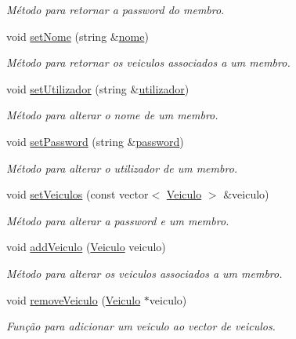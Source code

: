 \begin{DoxyCompactItemize}
\begin{DoxyCompactList}\small\item\em Método para retornar a password do membro. \end{DoxyCompactList}\item 
void \hyperlink{class_membro_a87f95f3869ef8ce4cfaf673cff30cdcc}{set\+Nome} (string \&\hyperlink{class_membro_a2598bbe34ae32a98f41468b2202a9555}{nome})
\begin{DoxyCompactList}\small\item\em Método para retornar os veiculos associados a um membro. \end{DoxyCompactList}\item 
void \hyperlink{class_membro_ac0ce078ab4d7d5a72e370ea6335e8eef}{set\+Utilizador} (string \&\hyperlink{class_membro_a42cc733ff94ec8d1bbfdacc62dfbb0e7}{utilizador})
\begin{DoxyCompactList}\small\item\em Método para alterar o nome de um membro. \end{DoxyCompactList}\item 
void \hyperlink{class_membro_ab5a7b1734090d146bb39f8cfa52be006}{set\+Password} (string \&\hyperlink{class_membro_ae2b12fc3e91efc674c07e735edf4ac21}{password})
\begin{DoxyCompactList}\small\item\em Método para alterar o utilizador de um membro. \end{DoxyCompactList}\item 
void \hyperlink{class_membro_ab40d72d229c4147372bd747d66176f55}{set\+Veiculos} (const vector$<$ \hyperlink{class_veiculo}{Veiculo} $>$ \&veiculo)
\begin{DoxyCompactList}\small\item\em Método para alterar a password e um membro. \end{DoxyCompactList}\item 
void \hyperlink{class_membro_a5b553a2050694926ea081585dc041c8a}{add\+Veiculo} (\hyperlink{class_veiculo}{Veiculo} veiculo)
\begin{DoxyCompactList}\small\item\em Método para alterar os veiculos associados a um membro. \end{DoxyCompactList}\item 
void \hyperlink{class_membro_a9d1b070ef532a6357ecbd0bb52a2be0a}{remove\+Veiculo} (\hyperlink{class_veiculo}{Veiculo} $\ast$veiculo)
\begin{DoxyCompactList}\small\item\em Função para adicionar um veiculo ao vector de veiculos. \end{DoxyCompactList}\item 

\end{DoxyCompactItemize}
